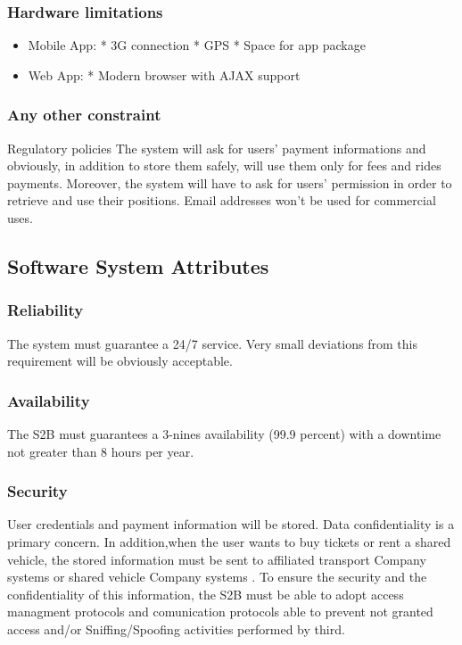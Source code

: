 	\subsubsection{Hardware limitations}
		\begin{itemize}
		\item Mobile App: \newline
		* 3G connection\newline
		* GPS\newline
		* Space for app package
		\item Web App:\newline
		* Modern browser with AJAX support
		\end{itemize}
	
	\subsubsection{Any other constraint}
	Regulatory policies
	The system will ask for users' payment informations and obviously, in addition to store them
	safely, will use them only for fees and rides payments.
	Moreover, the system will have to ask for users' permission in order to retrieve and use their
	positions.
	Email addresses won't be used for commercial uses.
\subsection{Software System Attributes} 
	\subsubsection{Reliability}
	The system must guarantee a 24/7 service. Very small deviations from this requirement will be
	obviously acceptable.
	\subsubsection{Availability}
	The S2B must guarantees a 3-nines availability (99.9 percent) with a downtime not greater than 8 hours per year.
	\subsubsection{Security}
User credentials and payment information will be stored. Data confidentiality is a primary concern.
In addition,when the user wants to buy tickets or rent a shared vehicle, the stored information must be sent to affiliated  transport Company systems or shared vehicle Company  systems . To ensure the security and the confidentiality of this information, the S2B must be able to adopt  access managment protocols and comunication protocols able to prevent not granted access and/or Sniffing/Spoofing activities performed by third.
	
